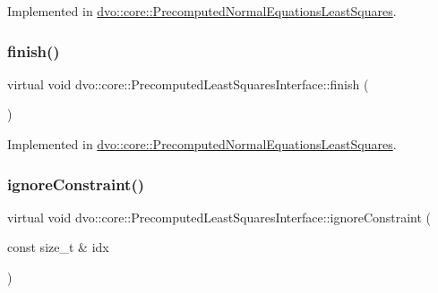 Implemented in \mbox{\hyperlink{classdvo_1_1core_1_1_precomputed_normal_equations_least_squares_a8fda94e1f0b88e65f2f3c7e98597f662}{dvo\+::core\+::\+Precomputed\+Normal\+Equations\+Least\+Squares}}.

\mbox{\label{classdvo_1_1core_1_1_precomputed_least_squares_interface_a6b811d85e3fe6a8a054b639171f9b353}} 
\subsubsection{\texorpdfstring{finish()}{finish()}}
{\footnotesize\ttfamily virtual void dvo\+::core\+::\+Precomputed\+Least\+Squares\+Interface\+::finish (\begin{DoxyParamCaption}{ }\end{DoxyParamCaption})\hspace{0.3cm}{\ttfamily [pure virtual]}}



Implemented in \mbox{\hyperlink{classdvo_1_1core_1_1_precomputed_normal_equations_least_squares_a57b83cc3f829f4416b09d4334206a592}{dvo\+::core\+::\+Precomputed\+Normal\+Equations\+Least\+Squares}}.

\mbox{\label{classdvo_1_1core_1_1_precomputed_least_squares_interface_a9b879b6600b82a8b989770bf27dad7bc}} 
\subsubsection{\texorpdfstring{ignore\+Constraint()}{ignoreConstraint()}}
{\footnotesize\ttfamily virtual void dvo\+::core\+::\+Precomputed\+Least\+Squares\+Interface\+::ignore\+Constraint (\begin{DoxyParamCaption}\item[{const size\+\_\+t \&}]{idx }\end{DoxyParamCaption})\hspace{0.3cm}{\ttfamily [pure virtual]}}



